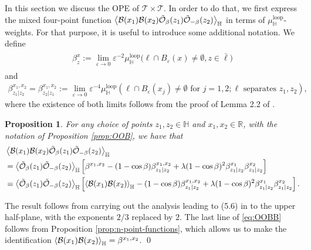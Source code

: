 \documentclass[a4paper,11pt]{article}
\newtheorem{proposition}{Proposition}[section]
\begin{document}
In this section we discuss the OPE of $\mathcal{T} \times \mathcal{T}$. In order to do that, we first express the mixed four-point function $\Braket{ \mathcal{B}(x_1) \mathcal{B}(x_2) \tilde{\mathcal{O}}_{\beta}(z_1) \tilde{\mathcal{O}}_{-\beta}(z_2) }_{\mathbb{H}}$ in terms of $\mu^{\text{loop}}_{\mathbb{H}}$-weights. For that purpose, it is useful to introduce some additional notation. We define
\begin{align}
\begin{split}
    \beta^x_z := \lim_{\varepsilon \to 0} \varepsilon^{-2} \mu^{\text{loop}}_{\mathbb{H}}\big( \ell \cap B_{\varepsilon}(x) \neq \emptyset, z \in \bar\ell \big)
\end{split}
\end{align}
and
\begin{align} \label{def:beta3412}
    \beta^{x_1,x_2}_{z_1|z_2} = \beta^{x_1,x_2}_{z_2|z_1} := \lim_{\varepsilon \to 0} \varepsilon^{-4} \mu_{\mathbb{H}}^{\text{loop}}(\ell \cap B_{\varepsilon}(x_j) \neq \emptyset \text{ for } j=1,2; \ell \text{ separates } z_1,z_2),
\end{align}
where the existence of both limits follows from the proof of Lemma 2.2 of \cite{camia2021scalar}.

\begin{proposition} \label{prop:OOBB}
For any choice of points $z_1,z_2 \in \mathbb{H}$ and $x_1,x_2 \in \mathbb{R}$, with the notation of Proposition \ref{prop:OOB}, we have that
\begin{align}
\begin{split} \label{eq:OOBB}
& \Braket{ \mathcal{B}(x_1) \mathcal{B}(x_2) \tilde{\mathcal{O}}_{\beta}(z_1) \tilde{\mathcal{O}}_{-\beta}(z_2) }_{\mathbb{H}} \\
&= \Braket{\tilde{\mathcal{O}}_{\beta}(z_1) \tilde{\mathcal{O}}_{-\beta}(z_2)}_{\mathbb{H}} \left[ \beta^{x_1,x_2} - (1-\cos\beta) \beta^{x_1,x_2}_{z_1|z_2} + \lambda (1-\cos\beta)^2 \beta^{x_1}_{z_1|z_2} \beta^{x_2}_{z_1|z_2} \right] \\
&= \Braket{\tilde{\mathcal{O}}_{\beta}(z_1) \tilde{\mathcal{O}}_{-\beta}(z_2)}_{\mathbb{H}} \left[ \Braket{\mathcal{B}(x_1) \mathcal{B}(x_2)}_{\mathbb{H}} - (1-\cos\beta) \beta^{x_1,x_2}_{z_1|z_2} + \lambda (1-\cos\beta)^2 \beta^{x_1}_{z_1|z_2} \beta^{x_2}_{z_1|z_2} \right].
\end{split}
\end{align}
\end{proposition}

 The result follows from carrying out the analysis leading to (5.6) in \cite{camia2021scalar} to the upper half-plane, with the exponents $2/3$ replaced by $2$. The last line of \eqref{eq:OOBB} follows from Proposition \ref{prop:n-point-functions}, which allows us to make the identification $\Braket{\mathcal{B}(x_1) \mathcal{B}(x_2)}_{\mathbb{H}} = \beta^{x_1,x_2}$. \qed
\end{document}
